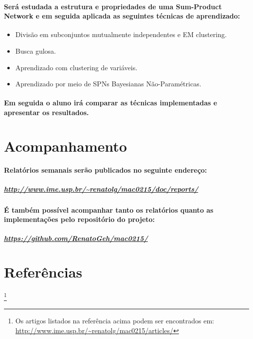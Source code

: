 \documentclass[a4paper,10pt]{article}
\newcommand\blfootnote[1]{%
  \begingroup
  \renewcommand\thefootnote{}\footnote{#1}%
  \addtocounter{footnote}{-1}%
  \endgroup
}
\theoremstyle{plain}
\begin{document}
\paragraph{
  Será estudada a estrutura e propriedades de uma Sum-Product Network e em seguida
aplicada as seguintes técnicas de aprendizado:
}

\begin{itemize} \itemsep0pt
  \item Divisão em subconjuntos mutualmente independentes e EM clustering.\cite{gens-domingos}  
  \item Busca gulosa.\cite{greedy-search}
  \item Aprendizado com clustering de variáveis.\cite{clustering}
  \item Aprendizado por meio de SPNs Bayesianas Não-Paramétricas.\cite{non-parametric-bayesian}
\end{itemize}

\paragraph{
  Em seguida o aluno irá comparar as técnicas implementadas e apresentar os resultados.
}

\section{Acompanhamento}

\paragraph{
  Relatórios semanais serão publicados no seguinte endereço: 
}

\subparagraph{\url{http://www.ime.usp.br/~renatolg/mac0215/doc/reports/}}

\paragraph{
  É também possível acompanhar tanto os relatórios quanto as implementações pelo repositório
do projeto:
}

\subparagraph{\url{https://github.com/RenatoGeh/mac0215/}}

\newpage

\section{Referências}

\printbibliography[title={Artigos},type=article]
\printbibliography[title={Websites},type=misc]

\blfootnote{Os artigos listados na referência acima podem ser encontrados em: 
  \url{http://www.ime.usp.br/~renatolg/mac0215/articles/}}
\end{document}
